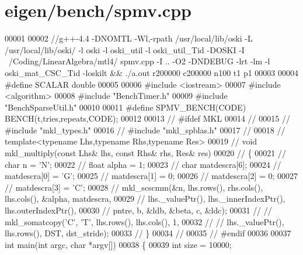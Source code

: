 \hypertarget{eigen_2bench_2spmv_8cpp_source}{}\section{eigen/bench/spmv.cpp}
\label{eigen_2bench_2spmv_8cpp_source}

\begin{DoxyCode}
00001 
00002 \textcolor{comment}{//g++-4.4 -DNOMTL  -Wl,-rpath /usr/local/lib/oski -L /usr/local/lib/oski/ -l oski -l oski\_util -l
       oski\_util\_Tid  -DOSKI -I ~/Coding/LinearAlgebra/mtl4/  spmv.cpp  -I .. -O2 -DNDEBUG -lrt  -lm -l oski\_mat\_CSC\_Tid 
       -loskilt && ./a.out r200000 c200000 n100 t1 p1}
00003 
00004 \textcolor{preprocessor}{#define SCALAR double}
00005 
00006 \textcolor{preprocessor}{#include <iostream>}
00007 \textcolor{preprocessor}{#include <algorithm>}
00008 \textcolor{preprocessor}{#include "BenchTimer.h"}
00009 \textcolor{preprocessor}{#include "BenchSparseUtil.h"}
00010 
00011 \textcolor{preprocessor}{#define SPMV\_BENCH(CODE) BENCH(t,tries,repeats,CODE);}
00012 
00013 \textcolor{comment}{// #ifdef MKL}
00014 \textcolor{comment}{//}
00015 \textcolor{comment}{// #include "mkl\_types.h"}
00016 \textcolor{comment}{// #include "mkl\_spblas.h"}
00017 \textcolor{comment}{//}
00018 \textcolor{comment}{// template<typename Lhs,typename Rhs,typename Res>}
00019 \textcolor{comment}{// void mkl\_multiply(const Lhs& lhs, const Rhs& rhs, Res& res)}
00020 \textcolor{comment}{// \{}
00021 \textcolor{comment}{//   char n = 'N';}
00022 \textcolor{comment}{//   float alpha = 1;}
00023 \textcolor{comment}{//   char matdescra[6];}
00024 \textcolor{comment}{//   matdescra[0] = 'G';}
00025 \textcolor{comment}{//   matdescra[1] = 0;}
00026 \textcolor{comment}{//   matdescra[2] = 0;}
00027 \textcolor{comment}{//   matdescra[3] = 'C';}
00028 \textcolor{comment}{//   mkl\_scscmm(&n, lhs.rows(), rhs.cols(), lhs.cols(), &alpha, matdescra,}
00029 \textcolor{comment}{//              lhs.\_valuePtr(), lhs.\_innerIndexPtr(), lhs.outerIndexPtr(),}
00030 \textcolor{comment}{//              pntre, b, &ldb, &beta, c, &ldc);}
00031 \textcolor{comment}{// //   mkl\_somatcopy('C', 'T', lhs.rows(), lhs.cols(), 1,}
00032 \textcolor{comment}{// //                 lhs.\_valuePtr(), lhs.rows(), DST, dst\_stride);}
00033 \textcolor{comment}{// \}}
00034 \textcolor{comment}{//}
00035 \textcolor{comment}{// #endif}
00036 
00037 \textcolor{keywordtype}{int} main(\textcolor{keywordtype}{int} argc, \textcolor{keywordtype}{char} *argv[])
00038 \{
00039   \textcolor{keywordtype}{int} size = 10000;

\end{DoxyCode}
